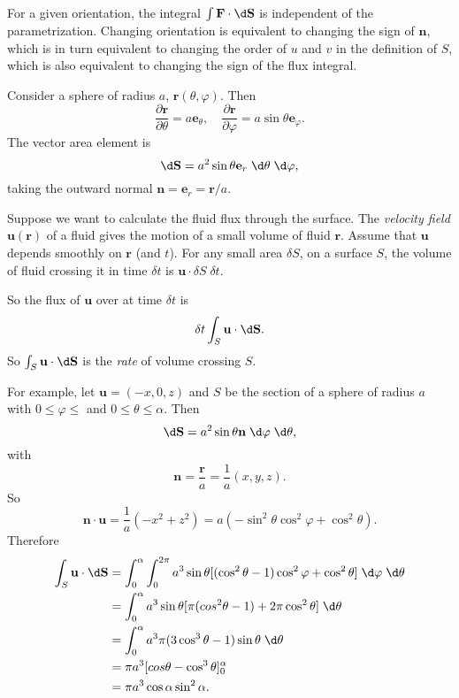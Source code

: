 \documentclass[a4paper]{article}
\begin{document}
For a given orientation, the integral $\int \mathbf{F}\cdot \d \mathbf{S}$ is independent of the parametrization. Changing orientation is equivalent to changing the sign of $\mathbf{n}$, which is in turn equivalent to changing the order of $u$ and $v$ in the definition of $S$, which is also equivalent to changing the sign of the flux integral.

\begin{eg}
  Consider a sphere of radius $a$, $\mathbf{r}(\theta, \varphi)$. Then
  \[
    \frac{\partial \mathbf{r}}{\partial \theta} = a\mathbf{e}_\theta,\quad \frac{\partial \mathbf{r}}{\partial \varphi} = a\sin \theta \mathbf{e}_\varphi.
  \]
  The vector area element is
  \[
    \d \mathbf{S} = a^2\sin \theta \mathbf{e}_r \;\d \theta\; \d\varphi,
  \]
  taking the outward normal $\mathbf{n} = \mathbf{e}_r = \mathbf{r}/a$.

  Suppose we want to calculate the fluid flux through the surface. The \emph{velocity field} $\mathbf{u}(\mathbf{r})$ of a fluid gives the motion of a small volume of fluid $\mathbf{r}$. Assume that $\mathbf{u}$ depends smoothly on $\mathbf{r}$ (and $t$). For any small area $\delta S$, on a surface $S$, the volume of fluid crossing it in time $\delta t$ is $\mathbf{u}\cdot \delta S\; \delta t$.
  \begin{center}
  \end{center}
  So the flux of $\mathbf{u}$ over at time $\delta t$ is
  \[
    \delta t\int_S \mathbf{u}\cdot \d \mathbf{S}.
  \]
  So $\int_S \mathbf{u}\cdot \d \mathbf{S}$ is the \emph{rate} of volume crossing $S$.

  For example, let $\mathbf{u} = (-x, 0, z)$ and $S$ be the section of a sphere of radius $a$ with $0 \leq \varphi \leq$ and $0 \leq \theta \leq \alpha$. Then
  \[
    \d \mathbf{S} = a^2 \sin \theta \mathbf{n}\;\d \varphi \;\d \theta,
  \]
  with 
  \[
    \mathbf{n} = \frac{\mathbf{r}}{a} = \frac{1}{a}(x, y, z).
  \]
  So
  \[
    \mathbf{n}\cdot \mathbf{u} = \frac{1}{a}(-x^2 + z^2) = a(-\sin^2\theta\cos^2\varphi + \cos^2 \theta).
  \]
  Therefore
  \begin{align*}
    \int_S \mathbf{u}\cdot \d \mathbf{S} &= \int_0^\alpha \int_0^{2\pi} a^3 \sin \theta[(\cos^2\theta - 1) \cos^2 \varphi + \cos^2 \theta]\;\d \varphi\;\d \theta\\
    &= \int_0^\alpha a^3\sin \theta[\pi(cos^2\theta - 1) + 2\pi \cos^2\theta]\; \d \theta\\
    &=\int_0^\alpha a^3\pi(3\cos^3 \theta - 1)\sin \theta\;\d \theta\\
    &= \pi a^3[cos\theta - \cos^3 \theta]_0^\alpha\\
    &= \pi a^3 \cos \alpha\sin^2 \alpha.
  \end{align*}
\end{eg}
\end{document}
